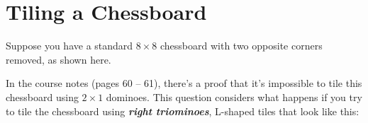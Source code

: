 \documentclass{article}
\renewcommand{\(}{\left(}
\renewcommand{\)}{\right)}
\theoremstyle{plain}
\theoremstyle{plain}
\theoremstyle{definition}
\begin{document}
\section{Tiling a Chessboard}

Suppose you have a standard $8 \times 8$ chessboard with two opposite
corners removed, as shown here.

\begin{figure}[h!]
\centering
{}
\end{figure}

In the course notes (pages 60 -- 61),
there's a proof that it's impossible to tile this chessboard using
$2 \times 1$ dominoes.
This question considers what happens if you try to tile the chessboard
using \textit{\textbf{right triominoes}}, L-shaped tiles that look like this:

\begin{figure}[h!]
\centering
{}
\end{figure}
\end{document}
